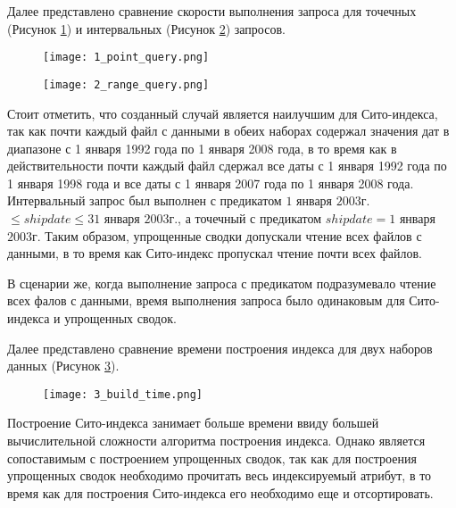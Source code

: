 Далее представлено сравнение скорости выполнения запроса для точечных (Рисунок \ref{figure:point_query}) и интервальных (Рисунок \ref{figure:range_query}) запросов.

\begin{figure}[p]
    \centering
    \texttt{[image: 1\_point\_query.png]}
    \caption{}
    \label{figure:point_query}
\end{figure}


\begin{figure}[p]
    \centering
    \texttt{[image: 2\_range\_query.png]}
    \caption{}
    \label{figure:range_query}
\end{figure}

Стоит отметить, что созданный случай является наилучшим для Сито-индекса, так как почти каждый файл с данными в обеих наборах содержал значения дат в диапазоне с 1 января 1992 года по 1 января 2008 года, в то время как в действительности почти каждый файл сдержал все даты с 1 января 1992 года по 1 января 1998 года и все даты с 1 января 2007 года по 1 января 2008 года. Интервальный запрос был выполнен с предикатом $1$ января $2003$г. $\leq shipdate \leq 31$ января $2003$г., а точечный с предикатом $shipdate = 1$ января $2003$г. Таким образом, упрощенные сводки допускали чтение всех файлов с данными, в то время как Сито-индекс пропускал чтение почти всех файлов.

В сценарии же, когда выполнение запроса с предикатом подразумевало чтение всех фалов с данными, время выполнения запроса было одинаковым для Сито-индекса и упрощенных сводок.

Далее представлено сравнение времени построения индекса для двух наборов данных (Рисунок \ref{figure:index_build_time}).

\begin{figure}[h]
    \centering
    \texttt{[image: 3\_build\_time.png]}
    \caption{}
    \label{figure:index_build_time}
\end{figure}

Построение Сито-индекса занимает больше времени ввиду большей вычислительной сложности алгоритма построения индекса. Однако является сопоставимым с построением упрощенных сводок, так как для построения упрощенных сводок необходимо прочитать весь индексируемый атрибут, в то время как для построения Сито-индекса его необходимо еще и отсортировать.


